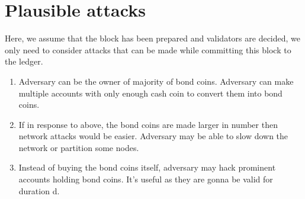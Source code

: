 \begin{enumerate}
\end{enumerate}

\section{Plausible attacks}

Here, we assume that the block has been prepared and validators are decided, we only need to consider attacks that can be made while committing this block to the ledger.

\begin{enumerate}
    \item Adversary can be the owner of majority of bond coins. Adversary can make multiple accounts with only enough cash coin to convert them into bond coins.
    \item If in response to above, the bond coins are made larger in number then network attacks would be easier. Adversary may be able to slow down the network or partition some nodes.
    \item Instead of buying the bond coins itself, adversary may hack prominent accounts holding bond coins. It's useful as they are gonna be valid for duration d.
\end{enumerate}